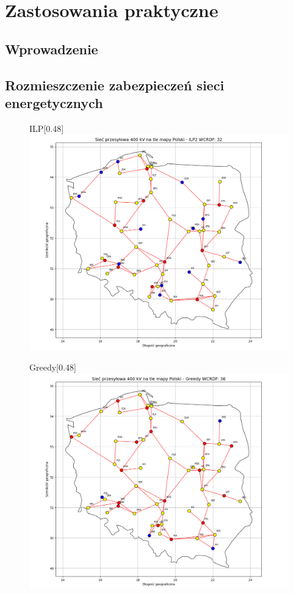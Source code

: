 \chapter{Zastosowania praktyczne}

\section{Wprowadzenie}

\section{Rozmieszczenie zabezpieczeń sieci energetycznych}

\begin{figure}[htbp]
    \centering
    \begin{subcaptionbox}{ILP\label{fig:img}}[0.48\linewidth]
        {\includegraphics[width=\linewidth]{assets/Poland/img.png}}
    \end{subcaptionbox}
    \hfill
    \begin{subcaptionbox}{Greedy\label{fig:img2}}[0.48\linewidth]
        {\includegraphics[width=\linewidth]{assets/Poland/img_2.png}}

\end{subcaptionbox}
\end{figure}
